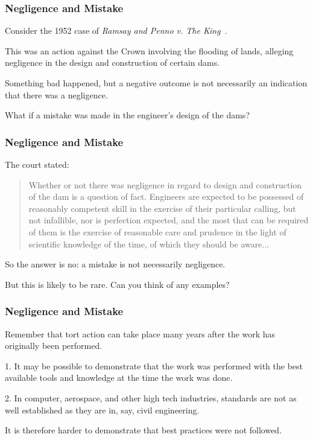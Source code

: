 \begin{frame}
\frametitle{Negligence and Mistake}

Consider the 1952 case of \textit{Ramsay and Penno v. The King}~\cite{lpe}.

This was an action against the Crown involving the flooding of lands, alleging negligence in the design and construction of certain dams.

Something bad happened, but a negative outcome is not necessarily an indication that there was a negligence.

What if a mistake was made in the engineer's design of the dams?

\end{frame}



\begin{frame}
\frametitle{Negligence and Mistake}

The court stated:

\begin{quote}
	Whether or not there was negligence in regard to design and construction of the dam is a question of fact. Engineers are expected to be possessed of reasonably competent skill in the exercise of their particular calling, but not infallible, nor is perfection expected, and the most that can be required of them is the exercise of reasonable care and prudence in the light of scientific knowledge of the time, of which they should be aware...
\end{quote}

So the answer is no: a mistake is not necessarily negligence.

But this is likely to be rare. Can you think of any examples?

\end{frame}



\begin{frame}
\frametitle{Negligence and Mistake}

Remember that tort action can take place many years after the work has originally been performed.

1. It may be possible to demonstrate that the work was performed with the best available tools and knowledge at the time the work was done.

2. In computer, aerospace, and other high tech industries, standards are not as well established as they are in, say, civil engineering.

It is therefore harder to demonstrate that best practices were not followed.

\end{frame}



